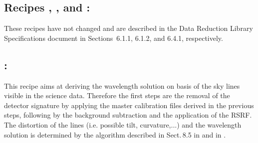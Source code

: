 \subsection{Recipes , , and :}
These recipes have not changed and are described in the Data Reduction Library Specifications document \cite{DRLS} in Sections~6.1.1, 6.1.2, and 6.4.1, respectively.

\subsection{:}
This recipe aims at deriving the wavelength solution on basis of the sky lines visible in the science data. Therefore the first steps are the removal of the detector signature by applying the master calibration files derived in the previous steps, following by the background subtraction and the application of the RSRF. The distortion of the lines (i.e. possible tilt, curvature,...) and the wavelength solution is determined by the algorithm described in Sect.\,8.5 in \cite{DRLS} and in \cite{METIS-calibration_plan}.

